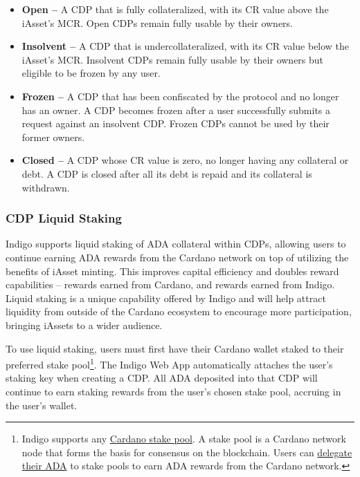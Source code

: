 \documentclass{article}
\begin{document}
\begin{sloppypar}
\begin{itemize}
\item
  \textbf{Open --} A CDP that is fully collateralized, with its CR value
  above the iAsset's MCR. Open CDPs remain fully usable by their owners.
\item
  \textbf{Insolvent --} A CDP that is undercollateralized, with its CR
  value below the iAsset's MCR. Insolvent CDPs remain fully usable by
  their owners but eligible to be frozen by any user.
\item
  \textbf{Frozen --} A CDP that has been confiscated by the protocol and
  no longer has an owner. A CDP becomes frozen after a user successfully
  submits a request against an insolvent CDP. Frozen CDPs cannot be used
  by their former owners.
\item
  \textbf{Closed --} A CDP whose CR value is zero, no longer having any
  collateral or debt. A CDP is closed after all its debt is repaid and
  its collateral is withdrawn.
\end{itemize}

\hypertarget{cdp-liquid-staking}{%
\subsubsection{CDP Liquid Staking}\label{cdp-liquid-staking}}

Indigo supports liquid staking of ADA collateral within CDPs, allowing
users to continue earning ADA rewards from the Cardano network on top of
utilizing the benefits of iAsset minting. This improves capital
efficiency and doubles reward capabilities -- rewards earned from
Cardano, and rewards earned from Indigo. Liquid staking is a unique
capability offered by Indigo and will help attract liquidity from
outside of the Cardano ecosystem to encourage more participation,
bringing iAssets to a wider audience.

To use liquid staking, users must first have their Cardano wallet staked
to their preferred stake pool\footnote{Indigo supports any
  \href{https://cardano.org/stake-pool-delegation/}{Cardano stake pool}.
  A stake pool is a Cardano network node that forms the basis for
  consensus on the blockchain. Users can
  \href{https://www.adastrong.com/staking/}{delegate their ADA} to stake
  pools to earn ADA rewards from the Cardano network.}. The Indigo Web
App automatically attaches the user's staking key when creating a CDP.
All ADA deposited into that CDP will continue to earn staking rewards
from the user's chosen stake pool, accruing in the user's wallet.


\end{sloppypar}
\end{document}
